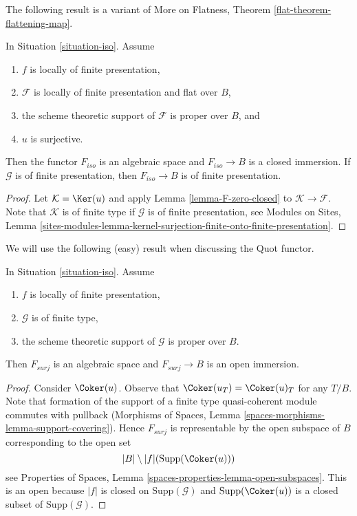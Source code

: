 \noindent
The following result is a variant of
More on Flatness, Theorem \ref{flat-theorem-flattening-map}.

\begin{lemma}
\label{lemma-F-iso-closed}
In Situation \ref{situation-iso}. Assume
\begin{enumerate}
\item $f$ is locally of finite presentation,
\item $\mathcal{F}$ is locally of finite presentation and flat over $B$,
\item the scheme theoretic support of $\mathcal{F}$ is proper over $B$, and
\item $u$ is surjective.
\end{enumerate}
Then the functor $F_{iso}$ is an algebraic space and $F_{iso} \to B$
is a closed immersion. If $\mathcal{G}$ is of finite presentation, then
$F_{iso} \to B$ is of finite presentation.
\end{lemma}

\begin{proof}
Let $\mathcal{K} = \Ker(u)$ and apply Lemma \ref{lemma-F-zero-closed}
to $\mathcal{K} \to \mathcal{F}$. Note that $\mathcal{K}$ is of finite type
if $\mathcal{G}$ is of finite presentation, see
Modules on Sites, Lemma
\ref{sites-modules-lemma-kernel-surjection-finite-onto-finite-presentation}.
\end{proof}

\noindent
We will use the following (easy) result when discussing the Quot functor.

\begin{lemma}
\label{lemma-F-surj-open}
In Situation \ref{situation-iso}. Assume
\begin{enumerate}
\item $f$ is locally of finite presentation,
\item $\mathcal{G}$ is of finite type,
\item the scheme theoretic support of $\mathcal{G}$ is proper over $B$.
\end{enumerate}
Then $F_{surj}$ is an algebraic space and $F_{surj} \to B$
is an open immersion.
\end{lemma}

\begin{proof}
Consider $\Coker(u)$. Observe that
$\Coker(u_T) = \Coker(u)_T$ for any $T/B$.
Note that formation of the support of a finite type
quasi-coherent module commutes with pullback
(Morphisms of Spaces, Lemma \ref{spaces-morphisms-lemma-support-covering}).
Hence $F_{surj}$ is representable by the open subspace of $B$
corresponding to the open set
$$
|B| \setminus |f|(\text{Supp}(\Coker(u)))
$$
see Properties of Spaces, Lemma \ref{spaces-properties-lemma-open-subspaces}.
This is an open because $|f|$ is closed on $\text{Supp}(\mathcal{G})$
and $\text{Supp}(\Coker(u))$ is a closed subset of
$\text{Supp}(\mathcal{G})$.
\end{proof}



















